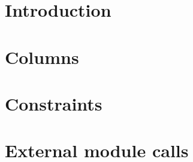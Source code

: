 

\section{Introduction}             \label{mxp: intro}                       
\section{Columns}                  \label{mxp: columns}                     
\section{Constraints}              \label{mxp: constraints}                 
\section{External module calls}    \label{mxp: calls}                       
